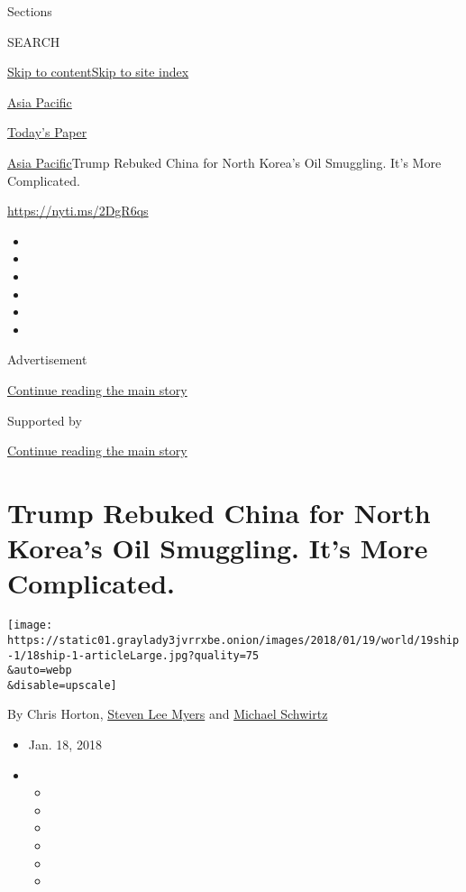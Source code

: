 Sections

SEARCH

\protect\hyperlink{site-content}{Skip to
content}\protect\hyperlink{site-index}{Skip to site index}

\href{https://www.nytimes3xbfgragh.onion/section/world/asia}{Asia
Pacific}

\href{https://myaccount.nytimes3xbfgragh.onion/auth/login?response_type=cookie\&client_id=vi}{}

\href{https://www.nytimes3xbfgragh.onion/section/todayspaper}{Today's
Paper}

\href{/section/world/asia}{Asia Pacific}\textbar{}Trump Rebuked China
for North Korea's Oil Smuggling. It's More Complicated.

\url{https://nyti.ms/2DgR6qs}

\begin{itemize}
\item
\item
\item
\item
\item
\item
\end{itemize}

Advertisement

\protect\hyperlink{after-top}{Continue reading the main story}

Supported by

\protect\hyperlink{after-sponsor}{Continue reading the main story}

\hypertarget{trump-rebuked-china-for-north-koreas-oil-smuggling-its-more-complicated}{%
\section{Trump Rebuked China for North Korea's Oil Smuggling. It's More
Complicated.}\label{trump-rebuked-china-for-north-koreas-oil-smuggling-its-more-complicated}}

\texttt{[image: https://static01.graylady3jvrrxbe.onion/images/2018/01/19/world/19ship-1/18ship-1-articleLarge.jpg?quality=75\\\&auto=webp\\\&disable=upscale]}

By Chris Horton,
\href{https://www.nytimes3xbfgragh.onion/by/steven-lee-myers}{Steven Lee
Myers} and
\href{https://www.nytimes3xbfgragh.onion/by/michael-schwirtz}{Michael
Schwirtz}

\begin{itemize}
\item
  Jan. 18, 2018
\item
  \begin{itemize}
  \item
  \item
  \item
  \item
  \item
  \item
  \end{itemize}
\end{itemize}

